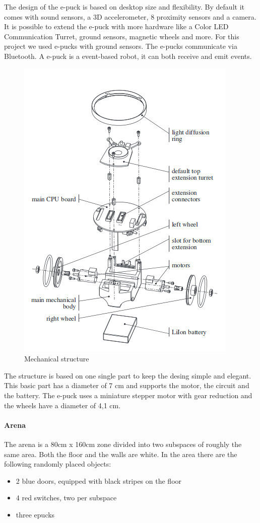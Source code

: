 \documentclass[12pt,a4paper]{article}
\begin{document}
The design of the e-puck is based on desktop size and flexibility. By default it comes with sound sensors, a 3D accelerometer, 8 proximity sensors and a camera. It is possible to extend the e-puck with more hardware like a Color LED Communication Turret, ground sensors, magnetic wheels and more. For this project we used e-pucks with ground sensors. The e-pucks communicate via Bluetooth. A e-puck is a event-based robot, it can both receive and emit events.

\begin{figure}[h!]
\begin{center}
\includegraphics[scale=0.5]{images/epuck-concept.png}
\caption{Mechanical structure}
\label{fig:epuck structure}
\end{center}
\end{figure} 
The structure is based on one single part to keep the desing simple and elegant. This basic part has a diameter of 7 cm and supports the motor, the circuit and the battery. The e-puck uses a miniature stepper motor with gear reduction and the wheels have a diameter of 4,1 cm. 

\paragraph{Arena}
The arena is a 80cm x 160cm zone divided into two subspaces of roughly the same area. Both the floor and the walls are white. In the area there are the following randomly placed objects:
\begin{itemize}
	\item 2 blue doors, equipped with black stripes on the floor
	\item 4 red switches, two per subspace
	\item three epucks
\end{itemize}
\end{document}

